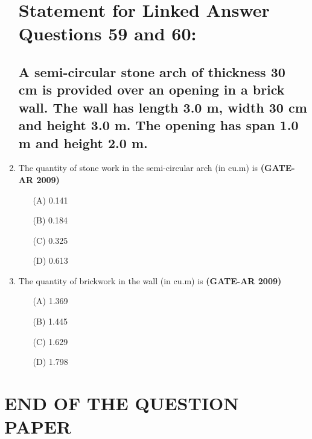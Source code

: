 \documentclass[a4paper,10pt]{article}
\begin{document}
\begin{enumerate}
\section*{Statement for Linked Answer Questions 59 and 60:}
\subsection*{A semi-circular stone arch of thickness 30 cm is provided over an opening in a brick wall. The wall has length 3.0 m, width 30 cm and height 3.0 m. The opening has span 1.0 m and height 2.0 m.}

    \item The quantity of stone work in the semi-circular arch (in cu.m) is \hfill \textbf{(GATE-AR 2009)}
    \begin{multicols}{4}
	\begin{itemize}
        \item[(A)] 0.141
        \item[(B)] 0.184
        \item[(C)] 0.325
        \item[(D)] 0.613
    \end{itemize}
	\end{multicols}

    \item The quantity of brickwork in the wall (in cu.m) is \hfill \textbf{(GATE-AR 2009)}
    \begin{multicols}{4}
	\begin{itemize}
        \item[(A)] 1.369
        \item[(B)] 1.445
        \item[(C)] 1.629
        \item[(D)] 1.798
    \end{itemize}
	\end{multicols}
    
\end{enumerate}

\centering
\section*{END OF THE QUESTION PAPER}
\end{document}
